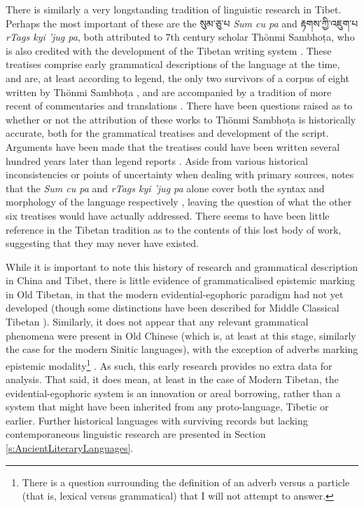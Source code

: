 There is similarly a very longstanding tradition of linguistic research in Tibet. Perhaps the most important of these are the \texttibetan{སུམ་ཅུ་པ} \textit{Sum cu pa} and \texttibetan{རྟགས་ཀྱི་འཇུག་པ} \textit{rTags kyi 'jug pa}, both attributed to 7th century scholar Thönmi Sambhoṭa, who is also credited with the development of the Tibetan writing system \cite{MuellerWitter2009}. These treatises comprise early grammatical descriptions of the language at the time, and are, at least according to legend, the only two survivors of a corpus of eight written by Thönmi Sambhoṭa \cite{Miller1963}, and are accompanied by a tradition of more recent of commentaries and translations \cite{Chashab2008}. There have been questions raised as to whether or not the attribution of these works to Thönmi Sambhoṭa is historically accurate, both for the grammatical treatises and development of the script. Arguments have been made that the treatises could have been written several hundred years later than legend reports \cite{Miller1963}. Aside from various historical inconsistencies or points of uncertainty when dealing with primary sources,  notes that the \textit{Sum cu pa} and \textit{rTags kyi 'jug pa} alone cover both the syntax and morphology of the language respectively \cite{Chashab2008}, leaving the question of what the other six treatises would have actually addressed. There seems to have been little reference in the Tibetan tradition as to the contents of this lost body of work, suggesting that they may never have existed.

While it is important to note this history of research and grammatical description in China and Tibet, there is little evidence of grammaticalised epistemic marking in Old Tibetan, in that the modern evidential-egophoric paradigm had not yet developed \cite{Hill2014} (though some distinctions have been described for Middle Classical Tibetan \cites{Zeisler2018}{Oisel2024}). Similarly, it does not appear that any relevant grammatical phenomena were present in Old Chinese (which is, at least at this stage, similarly the case for the modern Sinitic languages), with the exception of adverbs marking epistemic modality\footnote{There is a question surrounding the definition of an adverb versus a particle (that is, lexical versus grammatical) that I will not attempt to answer.} \cite{Pulleyblank1995}. As such, this early research provides no extra data for analysis. That said, it does mean, at least in the case of Modern Tibetan, the evidential-egophoric system is an innovation or areal borrowing, rather than a system that might have been inherited from any proto-language, Tibetic or earlier. Further historical languages with surviving records but lacking contemporaneous linguistic research are presented in Section \ref{s:AncientLiteraryLanguages}.

